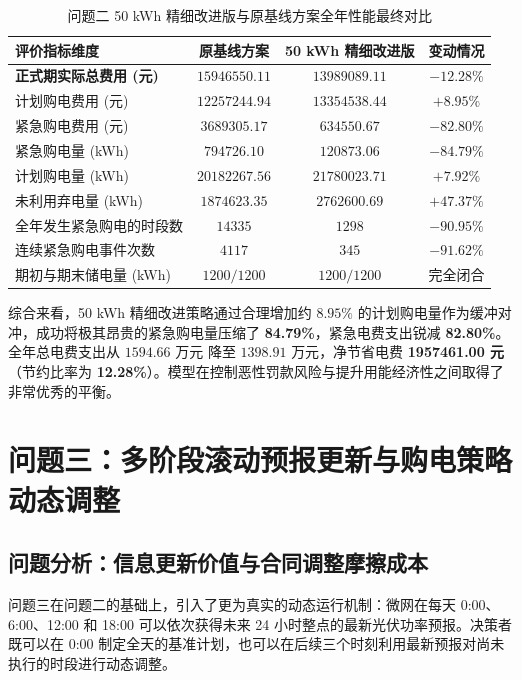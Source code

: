 \documentclass[withoutpreface]{cumcmthesis}
\begin{document}
\begin{table}[htbp]
\centering
\renewcommand{\arraystretch}{1.2}
\caption{问题二 50 kWh 精细改进版与原基线方案全年性能最终对比}
\label{tab:q2_final_summary}
\begin{tabular*}{\textwidth}{@{\extracolsep{\fill}}lccc@{}}
\toprule[1.5pt]
评价指标维度 & 原基线方案 & 50 kWh 精细改进版 & 变动情况 \\
\midrule[1pt]
\textbf{正式期实际总费用 (元)} & $15946550.11$ & $\mathbf{13989089.11}$ & $\mathbf{-12.28\%}$ \\
计划购电费用 (元)            & $12257244.94$ & $13354538.44$          & $+8.95\%$ \\
紧急购电费用 (元)            & $3689305.17$  & $\mathbf{634550.67}$   & $\mathbf{-82.80\%}$ \\
紧急购电量 (kWh)             & $794726.10$   & $\mathbf{120873.06}$   & $\mathbf{-84.79\%}$ \\
计划购电量 (kWh)             & $20182267.56$ & $21780023.71$          & $+7.92\%$ \\
未利用弃电量 (kWh)           & $1874623.35$  & $2762600.69$           & $+47.37\%$ \\
全年发生紧急购电的时段数     & $14335$       & $1298$                 & $-90.95\%$ \\
连续紧急购电事件次数         & $4117$        & $345$                  & $-91.62\%$ \\
期初与期末储电量 (kWh)       & $1200 / 1200$ & $1200 / 1200$          & 完全闭合 \\
\bottomrule[1.5pt]
\end{tabular*}
\end{table}

综合来看，50 kWh 精细改进策略通过合理增加约 $8.95\%$ 的计划购电量作为缓冲对冲，成功将极其昂贵的紧急购电量压缩了 \textbf{84.79\%}，紧急电费支出锐减 \textbf{82.80\%}。全年总电费支出从 $1594.66\text{ 万元}$ 降至 $\mathbf{1398.91\text{ 万元}}$，净节省电费 \textbf{1957461.00 元}（节约比率为 \textbf{12.28\%}）。模型在控制恶性罚款风险与提升用能经济性之间取得了非常优秀的平衡。
\section{问题三：多阶段滚动预报更新与购电策略动态调整}

\subsection{问题分析：信息更新价值与合同调整摩擦成本}
问题三在问题二的基础上，引入了更为真实的动态运行机制：微网在每天 0:00、6:00、12:00 和 18:00 可以依次获得未来 24 小时整点的最新光伏功率预报。决策者既可以在 0:00 制定全天的基准计划，也可以在后续三个时刻利用最新预报对尚未执行的时段进行动态调整。
\end{document}

